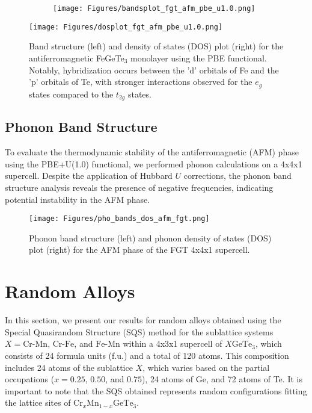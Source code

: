 \begin{figure}[H]
	\begin{subfigure}{.5\textwidth}
		\centering
		\texttt{[image: Figures/bandsplot\_fgt\_afm\_pbe\_u1.0.png]}
	\end{subfigure}%
	\begin{minipage}{.5\textwidth}
		\vspace{-12.6cm}
		\centering
		\texttt{[image: Figures/dosplot\_fgt\_afm\_pbe\_u1.0.png]}
		\captionsetup{justification=centering}
	\end{minipage}
	\caption{Band structure (left) and density of states (DOS) plot (right) for the antiferromagnetic FeGeTe$_3$ monolayer using the PBE functional. Notably, hybridization occurs between the 'd' orbitals of Fe and the 'p' orbitals of Te, with stronger interactions observed for the $e_{g}$ states compared to the $t_{2g}$ states.}
	\label{fig:fgtpbeucorrection}
\end{figure}


\subsection{Phonon Band Structure}

To evaluate the thermodynamic stability of the antiferromagnetic (AFM) phase using the PBE+U(1.0) functional, we performed phonon calculations on a 4x4x1 supercell. Despite the application of Hubbard $U$ corrections, the phonon band structure analysis reveals the presence of negative frequencies, indicating potential instability in the AFM phase.

\begin{figure}[H]
	\centering
	\texttt{[image: Figures/pho\_bands\_dos\_afm\_fgt.png]}
	\caption{Phonon band structure (left) and phonon density of states (DOS) plot (right) for the AFM phase of the FGT 4x4x1 supercell.}
	\label{fig:4.19}
\end{figure}



\section{Random Alloys}

In this section, we present our results for random alloys obtained using the Special Quasirandom Structure (SQS) method for the sublattice systems $X = \text{Cr-Mn}$, $\text{Cr-Fe}$, and $\text{Fe-Mn}$ within a 4x3x1 supercell of $X\text{GeTe}_3$, which consists of 24 formula units (f.u.) and a total of 120 atoms. This composition includes 24 atoms of the sublattice $X$, which varies based on the partial occupations ($x = 0.25$, $0.50$, and $0.75$), 24 atoms of Ge, and 72 atoms of Te. It is important to note that the SQS obtained represents random configurations fitting the lattice sites of $\text{Cr}_{x}\text{Mn}_{1-x}\text{GeTe}_3$. 

